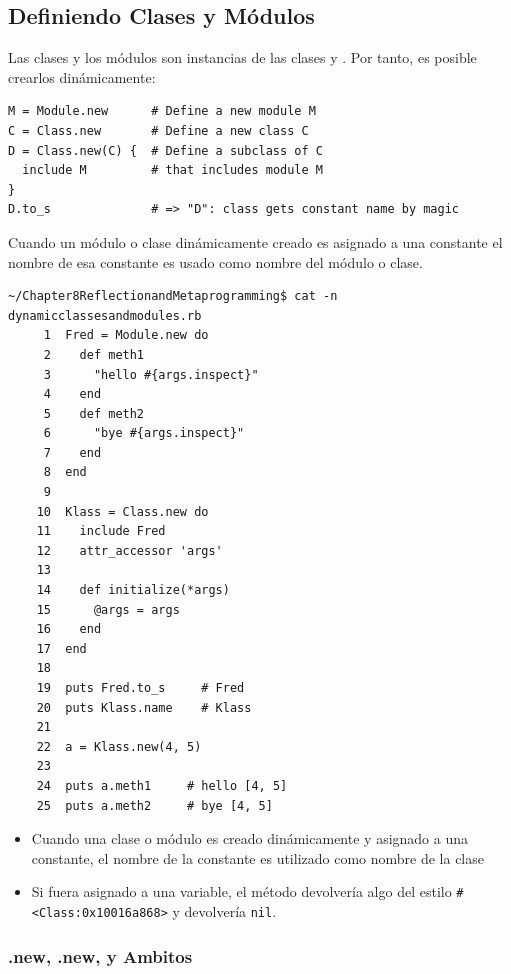   \subsection{Definiendo Clases y Módulos}

Las clases y los módulos son instancias de las clases  y .
Por tanto, es posible crearlos dinámicamente:
\begin{verbatim}
M = Module.new      # Define a new module M
C = Class.new       # Define a new class C
D = Class.new(C) {  # Define a subclass of C
  include M         # that includes module M
}
D.to_s              # => "D": class gets constant name by magic
\end{verbatim}

Cuando un módulo o clase dinámicamente creado es asignado a una constante el nombre de esa 
constante es usado como nombre del módulo o clase.


\begin{verbatim}
~/Chapter8ReflectionandMetaprogramming$ cat -n dynamicclassesandmodules.rb 
     1  Fred = Module.new do
     2    def meth1
     3      "hello #{args.inspect}"
     4    end
     5    def meth2
     6      "bye #{args.inspect}"
     7    end
     8  end
     9  
    10  Klass = Class.new do
    11    include Fred
    12    attr_accessor 'args'
    13  
    14    def initialize(*args)
    15      @args = args
    16    end
    17  end
    18  
    19  puts Fred.to_s     # Fred
    20  puts Klass.name    # Klass
    21  
    22  a = Klass.new(4, 5)
    23  
    24  puts a.meth1     # hello [4, 5] 
    25  puts a.meth2     # bye [4, 5]
\end{verbatim}
\begin{itemize}
\item
Cuando una clase o módulo es creado dinámicamente y asignado a una constante, el nombre de la constante
es utilizado como nombre de la clase 

\item
Si fuera asignado a una
variable, el método  devolvería algo del estilo
\verb|#<Class:0x10016a868>| y  devolvería \verb|nil|.
\end{itemize}

\subsubsection{\Class{}.new, \Module{}.new,  y Ambitos}

